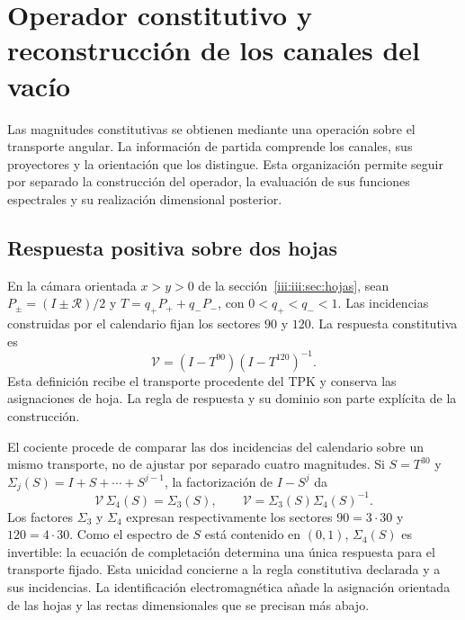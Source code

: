 \section{Operador constitutivo y reconstrucción de los canales del vacío}
\label{iii:iii:sec:constitutiva}

Las magnitudes constitutivas se obtienen mediante una operación sobre el
transporte angular. La información de partida comprende los canales, sus
proyectores y la orientación que los distingue. Esta organización permite
seguir por separado la construcción del operador, la evaluación de sus
funciones espectrales y su realización dimensional posterior.

\subsection{Respuesta positiva sobre dos hojas}

En la cámara orientada $x>y>0$ de la sección~\ref{iii:iii:sec:hojas}, sean
$P_\pm=(I\pm\mathcal R)/2$ y
$T=q_+P_++q_-P_-$, con $0<q_+<q_-<1$. Las incidencias construidas por el
calendario fijan los sectores $90$ y $120$. La respuesta constitutiva es
\begin{equation}
 \mathcal V=(I-T^{90})(I-T^{120})^{-1}.
 \label{iii:iii:eq:vacuum-op}
\end{equation}
Esta definición recibe el transporte procedente del TPK y conserva las
asignaciones de hoja. La regla de respuesta y su dominio son parte explícita
de la construcción.

El cociente procede de comparar las dos incidencias del calendario sobre
un mismo transporte, no de ajustar por separado cuatro magnitudes. Si
$S=T^{30}$ y $\Sigma_j(S)=I+S+\cdots+S^{j-1}$, la factorización de
$I-S^j$ da
\begin{equation}
 \mathcal V\,\Sigma_4(S)=\Sigma_3(S),\qquad
 \mathcal V=\Sigma_3(S)\Sigma_4(S)^{-1}.
 \label{iii:iii:eq:completion-response}
\end{equation}
Los factores $\Sigma_3$ y $\Sigma_4$ expresan respectivamente los
sectores $90=3\cdot30$ y $120=4\cdot30$. Como el espectro de $S$ está
contenido en $(0,1)$, $\Sigma_4(S)$ es invertible: la ecuación de
completación determina una única respuesta para el transporte fijado.
Esta unicidad concierne a la regla constitutiva declarada y a sus
incidencias. La identificación electromagnética añade la asignación
orientada de las hojas y las rectas dimensionales que se precisan más
abajo.

